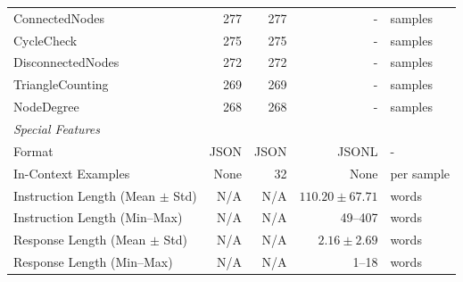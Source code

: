 \begin{table}[h]
{\begin{tabular}{lrrrl}
ConnectedNodes & 277 & 277 & - & samples \\
CycleCheck & 275 & 275 & - & samples \\
DisconnectedNodes & 272 & 272 & - & samples \\
TriangleCounting & 269 & 269 & - & samples \\
NodeDegree & 268 & 268 & - & samples \\
\midrule
\multicolumn{5}{l}{\textit{Special Features}} \\
Format & JSON & JSON & JSONL & - \\
In-Context Examples & None & 32 & None & per sample \\
Instruction Length (Mean $\pm$ Std) & N/A & N/A & $110.20 \pm 67.71$ & words \\
Instruction Length (Min--Max) & N/A & N/A & 49--407 & words \\
Response Length (Mean $\pm$ Std) & N/A & N/A & $2.16 \pm 2.69$ & words \\
Response Length (Min--Max) & N/A & N/A & 1--18 & words \\
\bottomrule
\end{tabular}
}
\end{table}